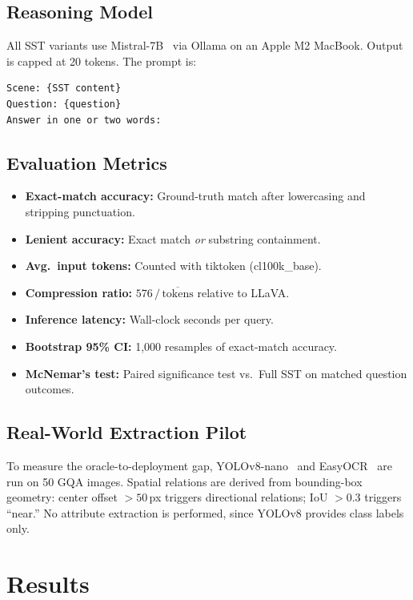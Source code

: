 \documentclass[10pt,twocolumn]{article}
\begin{document}
\subsection{Reasoning Model}

All SST variants use Mistral-7B~\cite{jiang2023mistral} via Ollama on an Apple M2 MacBook. Output is capped at 20 tokens. The prompt is:

\begin{lstlisting}
Scene: {SST content}
Question: {question}
Answer in one or two words:
\end{lstlisting}

\subsection{Evaluation Metrics}

\begin{itemize}
  \item \textbf{Exact-match accuracy:} Ground-truth match after lowercasing and stripping punctuation.
  \item \textbf{Lenient accuracy:} Exact match \emph{or} substring containment.
  \item \textbf{Avg.\ input tokens:} Counted with tiktoken (cl100k\_base).
  \item \textbf{Compression ratio:} $576\,/\,\overline{\text{tokens}}$ relative to LLaVA.
  \item \textbf{Inference latency:} Wall-clock seconds per query.
  \item \textbf{Bootstrap 95\% CI:} 1,000 resamples of exact-match accuracy.
  \item \textbf{McNemar's test:} Paired significance test vs.\ Full SST on matched question outcomes.
\end{itemize}

\subsection{Real-World Extraction Pilot}

To measure the oracle-to-deployment gap, YOLOv8-nano~\cite{yolov8} and EasyOCR~\cite{easyocr} are run on 50 GQA images. Spatial relations are derived from bounding-box geometry: center offset $>50$\,px triggers directional relations; IoU $>0.3$ triggers ``near.'' No attribute extraction is performed, since YOLOv8 provides class labels only.

\section{Results}
\end{document}
